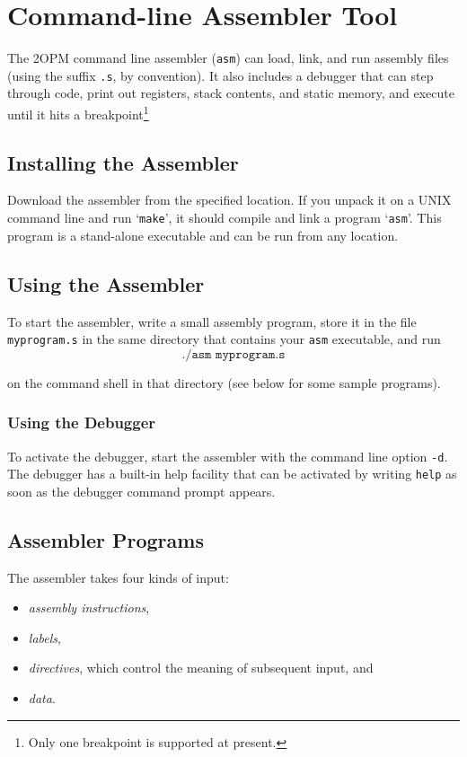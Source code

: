 \documentclass{article}
\begin{document}
\section{Command-line Assembler Tool}

The 2OPM command line assembler (\texttt{asm}) can load, link, and run assembly files
(using the suffix \texttt{.s}, by convention).  It also includes a debugger that can step
through code, print out registers, stack contents, and static memory, and execute until it hits a breakpoint\footnote{
Only one breakpoint is supported at present.}

\subsection{Installing the Assembler}
Download the assembler from the specified location.  If you unpack it
on a UNIX command line and run `\texttt{make}', it should compile
and link a program `\texttt{asm}'.  This program is a stand-alone executable
and can be run from any location.

\subsection{Using the Assembler}
To start the assembler, write a small assembly program, store it in the file \texttt{myprogram.s} in the same
directory that contains your \texttt{asm} executable, and run
\[
\texttt{./asm myprogram.s}
\]

on the command shell in that directory (see below for some sample programs).

\subsubsection{Using the Debugger}
To activate the debugger, start the assembler with the command line option \texttt{-d}.
The debugger has a built-in help facility that can be activated by writing \texttt{help} as
soon as the debugger command prompt appears.

\subsection{Assembler Programs}

The assembler takes four kinds of input:
\begin{itemize}
  \item \emph{assembly instructions},
  \item \emph{labels},
  \item \emph{directives}, which control the meaning of subsequent input, and
  \item \emph{data}.
\end{itemize}
\end{document}
